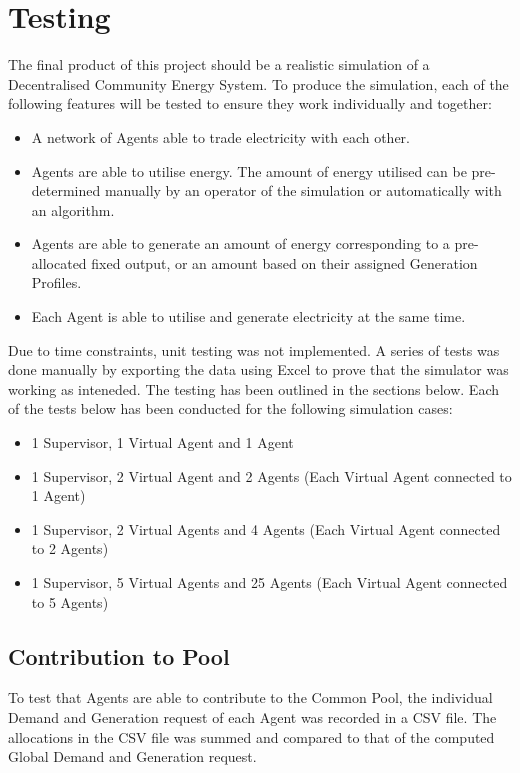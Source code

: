 \chapter{Testing}
\label{Testing}

The final product of this project should be a realistic simulation of a Decentralised Community Energy System. To produce the simulation, each of the following features will be tested to ensure they work individually and together:

\begin{itemize}
\item A network of Agents able to trade electricity with each other.
\item Agents are able to utilise energy. The amount of energy utilised can be pre-determined manually by an operator of the simulation or automatically with an algorithm.
\item Agents are able to generate an amount of energy corresponding to a pre-allocated fixed output, or an amount based on their assigned Generation Profiles.
\item Each Agent is able to utilise and generate electricity at the same time.
\end{itemize}

Due to time constraints, unit testing was not implemented. A series of tests was done manually by exporting the data using Excel to prove that the simulator was working as inteneded. The testing has been outlined in the sections below. Each of the tests below has been conducted for the following simulation cases:

\begin{itemize}
	\item 1 Supervisor, 1 Virtual Agent and 1 Agent
	\item 1 Supervisor, 2 Virtual Agent and 2 Agents (Each Virtual Agent connected to 1 Agent)
	\item 1 Supervisor, 2 Virtual Agents and 4 Agents (Each Virtual Agent connected to 2 Agents)
	\item 1 Supervisor, 5 Virtual Agents and 25 Agents (Each Virtual Agent connected to 5 Agents)
\end{itemize}

\section*{Contribution to Pool} %
To test that Agents are able to contribute to the Common Pool, the individual Demand and Generation request of each Agent was recorded in a CSV file. The allocations in the CSV file was summed and compared to that of the computed Global Demand and Generation request.

